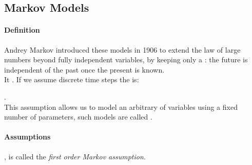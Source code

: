 \subsection{Markov Models}
\paragraph{Definition}
Andrey Markov introduced these models in 1906 to extend the law of large numbers beyond fully
independent variables, by keeping only a : the future is independent
of the past once the present is known.\\
It .
If we assume discrete time steps the  is:
\begin{center}
\end{center}
.\\
This assumption allows us to model an arbitrary of variables using a fixed number of parameters, such
models are called .
\paragraph{Assumptions}
, is called the \emph{first order Markov assumption.}

